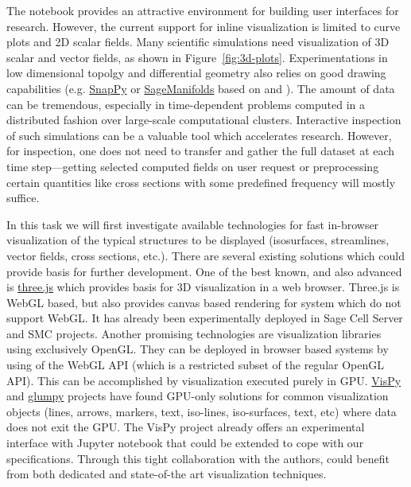 \begin{workpackage}
\begin{tasklist}
\begin{task}[title=Visualization system for 3D data in web-notebook
,id=vis3d,lead=SR, partners={US,PS,USO}, PM=13, wphases=0-24]

The \Jupyter notebook provides an attractive environment for building
user interfaces for research. However, the current support for inline
visualization is limited to curve plots and 2D scalar fields. Many
scientific simulations need visualization of 3D scalar and vector
fields, as shown in Figure~\ref{fig:3d-plots}.  Experimentations in
low dimensional topolgy and differential geometry also relies on good
drawing capabilities
(e.g. \href{http://www.math.uic.edu/t3m/SnapPy/}{SnapPy} or
\href{http://sagemanifolds.obspm.fr/}{SageManifolds} based on \IPython
and \Sage). The amount of data can be tremendous, especially in
time-dependent problems computed in a distributed fashion over
large-scale computational clusters. Interactive inspection of such
simulations can be a valuable tool which accelerates
research. However, for inspection, one does not need to transfer and
gather the full dataset at each time step---getting selected computed
fields on user request or preprocessing certain quantities like cross
sections with some predefined frequency will mostly suffice.

In this task we will first investigate available technologies for fast
in-browser visualization of the typical structures to be displayed
(isosurfaces, streamlines, vector fields, cross sections, etc.).
There are several existing solutions which could provide basis for
further development. One of the best known, and also advanced is
\href{http://threejs.org/}{three.js} which provides basis for 3D
visualization in a web browser. Three.js is WebGL based, but also
provides canvas based rendering for system which do not support
WebGL. It has already been experimentally deployed in Sage Cell Server
and SMC projects. Another promising technologies are visualization
libraries using exclusively OpenGL. They can be deployed in browser
based systems by using of the WebGL API (which is a restricted subset
of the regular OpenGL API). This can be accomplished by visualization
executed purely in GPU. \href{http://vispy.org/}{VisPy} and
\href{http://glumpy.github.io/}{glumpy} projects have found GPU-only
solutions for common visualization objects (lines, arrows, markers,
text, iso-lines, iso-surfaces, text, etc) where data does not exit the
GPU. The VisPy project already offers an experimental interface with
Jupyter notebook that could be extended to cope with our
specifications. Through this tight collaboration with the authors,
\TheProject could benefit from both dedicated and state-of-the art
visualization techniques.


\end{task}
\end{tasklist}
\end{workpackage}
